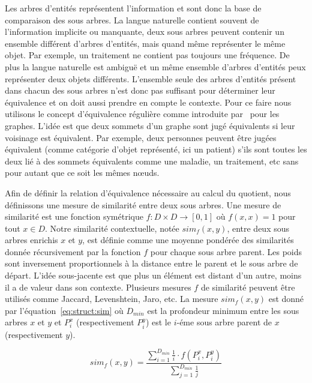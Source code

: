 Les arbres d'entités représentent l'information et sont donc la base de comparaison des sous arbres.
La langue naturelle contient souvent de l'information implicite ou manquante, deux sous arbres peuvent contenir un ensemble différent d'arbres d'entités, mais quand même représenter le même objet.
Par exemple, un traitement ne contient pas toujours une fréquence.
De plus la langue naturelle est ambiguë et un même ensemble d'arbres d'entités peux représenter deux objets différents.
L'ensemble seule des arbres d'entités présent dans chacun des sous arbres n'est donc pas suffisant pour déterminer leur équivalence et on doit aussi prendre en compte le contexte.
Pour ce faire nous utilisons le concept d'équivalence régulière comme introduite par~\cite{whiteGraphSemigroupHomomorphisms1983} pour les graphes.
L'idée est que deux sommets d'un graphe sont jugé équivalents si leur voisinage est équivalent.
Par exemple, deux personnes peuvent être jugées équivalent (comme catégorie d'objet représenté, ici un patient) s'ils sont toutes les deux lié à des sommets équivalents comme une maladie, un traitement, etc sans pour autant que ce soit les mêmes nœuds.

Afin de définir la relation d'équivalence nécessaire au calcul du quotient, nous définissons une mesure de similarité entre deux sous arbres.
Une mesure de similarité est une fonction symétrique $f : D \times D \to [0,1]$ où $f(x, x) = 1$ pour tout $x \in D$.
Notre similarité contextuelle, notée $sim_f(x, y)$, entre deux sous arbres enrichis $x$ et $y$, est définie comme une moyenne pondérée des similarités donnée récursivement par la fonction $f$ pour chaque sous arbre parent.
Les poids sont inversement proportionnels à la distance entre le parent et le sous arbre de départ.
L'idée sous-jacente est que plus un élément est distant d'un autre, moins il a de valeur dans son contexte.
Plusieurs mesures $f$ de similarité peuvent être utilisés comme Jaccard, Levenshtein, Jaro, etc.
La mesure $sim_f(x, y)$ est donné par l'équation~\ref{eq:struct:sim} où $D_{min}$ est la profondeur minimum entre les sous arbres $x$ et $y$ et $P^x_i$ (respectivement $P^y_i$) est le $i$-éme sous arbre parent de $x$ (respectivement $y$).

\begin{equation}
    sim_f(x, y) = \frac{\sum_{i=1}^{D_{min}} \frac{1}{i} \cdot f(P^x_i, P^y_i)}{\sum_{j=1}^{D_{min}} \frac{1}{j}} \label{eq:struct:sim}
\end{equation}

